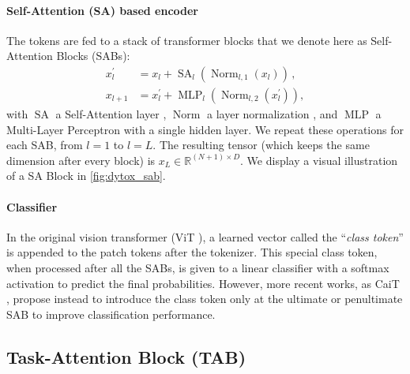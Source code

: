 \paragraph{Self-Attention (SA) based encoder}The tokens are fed to a stack of transformer blocks
that we denote here as Self-Attention Blocks (SABs):
\begin{equation}
    \begin{aligned}
        x_{l}^{\prime} & =x_{l}+\operatorname{SA}_l\left(\operatorname{Norm}_{l,1}\left(x_{l}\right)\right)\,,                  \\
        x_{l+1}        & =x_{l}^{\prime}+\operatorname{MLP}_l\left(\operatorname{Norm}_{l,2}\left(x_{l}^{\prime}\right)\right),
    \end{aligned}
    \label{eq:dytox_sa_block}
\end{equation}
with $\operatorname{SA}$ a Self-Attention layer \citep{vaswani2017transformer}, $\operatorname{Norm}$
a layer normalization \citep{ba2016layernorm}, and $\operatorname{MLP}$ a Multi-Layer Perceptron with
a single hidden layer. We repeat these operations for each SAB, from $l=1$ to $l=L$. The resulting
tensor (which keeps the same dimension after every block) is $x_{L} \in \mathbb{R}^{(N+1) \times
        D}$. We display a visual illustration of a SA Block in \autoref{fig:dytox_sab}.


\paragraph{Classifier} In the original vision transformer (ViT \citep{dosovitskiy2020vit}), a learned
vector called the ``\textit{class token}'' is appended to the patch tokens after the tokenizer. This
special class token, when processed after all the SABs, is given to a linear classifier with a
softmax activation to predict the final probabilities. However, more recent works, as CaiT
\citep{touvron2021cait}, propose instead to introduce the class token only at the ultimate or
penultimate SAB to improve classification performance.

\subsection{Task-Attention Block (TAB)}
\label{sec:dytox_tab}

